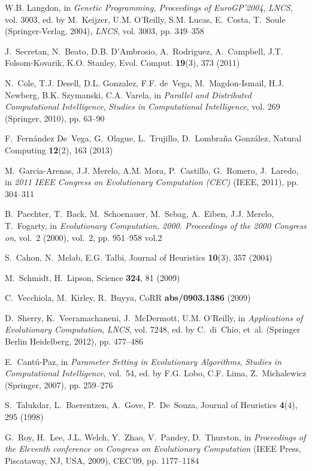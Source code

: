 \begin{thebibliography}{10}
W.B. Langdon, in \emph{Genetic Programming, Proceedings of EuroGP'2004},
  \emph{LNCS}, vol. 3003, ed. by M.~Keijzer, U.M. O'Reilly, S.M. Lucas,
  E.~Costa, T.~Soule (Springer-Verlag, 2004), \emph{LNCS}, vol. 3003, pp.
  349--358

J.~Secretan, N.~Beato, D.B. D'Ambrosio, A.~Rodriguez, A.~Campbell, J.T.
  Folsom-Kovarik, K.O. Stanley, Evol. Comput. \textbf{19}(3), 373 (2011)

N.~Cole, T.J. Desell, D.L. Gonzalez, F.F. de~Vega, M.~Magdon-Ismail, H.J.
  Newberg, B.K. Szymanski, C.A. Varela, in \emph{Parallel and Distributed
  Computational Intelligence}, \emph{Studies in Computational Intelligence},
  vol. 269 (Springer, 2010), pp. 63--90

F.~Fern\'{a}ndez De~Vega, G.~Olague, L.~Trujillo, D.~Lombra\~{n}a Gonz\'{a}lez,
  Natural Computing \textbf{12}(2), 163 (2013)

M.~Garcia-Arenas, J.J. Merelo, A.M. Mora, P.~Castillo, G.~Romero, J.~Laredo, in
  \emph{2011 IEEE Congress on Evolutionary Computation (CEC)} (IEEE, 2011), pp.
  304--311

B.~Paechter, T.~Back, M.~Schoenauer, M.~Sebag, A.~Eiben, J.J. Merelo,
  T.~Fogarty, in \emph{Evolutionary Computation, 2000. Proceedings of the 2000
  Congress on}, vol.~2 (2000), vol.~2, pp. 951--958 vol.2

S.~Cahon, N.~Melab, E.G. Talbi, Journal of Heuristics \textbf{10}(3), 357
  (2004)

M.~Schmidt, H.~Lipson, Science \textbf{324}, 81 (2009)

C.~Vecchiola, M.~Kirley, R.~Buyya, CoRR \textbf{abs/0903.1386} (2009)

D.~Sherry, K.~Veeramachaneni, J.~McDermott, U.M. O'Reilly, in
  \emph{Applications of Evolutionary Computation}, \emph{LNCS}, vol. 7248, ed.
  by C.~di~Chio, et~al. (Springer Berlin Heidelberg, 2012), pp. 477--486

E.~Cant\'u-Paz, in \emph{Parameter Setting in Evolutionary Algorithms},
  \emph{Studies in Computational Intelligence}, vol.~54, ed. by F.G. Lobo, C.F.
  Lima, Z.~Michalewicz (Springer, 2007), pp. 259--276

S.~Talukdar, L.~Baerentzen, A.~Gove, P.~De~Souza, Journal of Heuristics
  \textbf{4}(4), 295 (1998)

G.~Roy, H.~Lee, J.L. Welch, Y.~Zhao, V.~Pandey, D.~Thurston, in
  \emph{Proceedings of the Eleventh conference on Congress on Evolutionary
  Computation} (IEEE Press, Piscataway, NJ, USA, 2009), CEC'09, pp. 1177--1184


\end{thebibliography}
